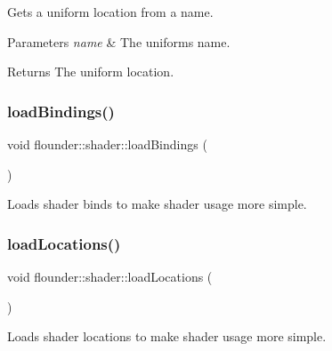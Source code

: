 Gets a uniform location from a name. 


\begin{DoxyParams}{Parameters}
{\em name} & The uniforms name. \\
\hline
\end{DoxyParams}
\begin{DoxyReturn}{Returns}
The uniform location. 
\end{DoxyReturn}
\mbox{\label{classflounder_1_1shader_ababc32f14fa38c2c3e0337c5537b1dcd}} 
\subsubsection{\texorpdfstring{load\+Bindings()}{loadBindings()}}
{\footnotesize\ttfamily void flounder\+::shader\+::load\+Bindings (\begin{DoxyParamCaption}{ }\end{DoxyParamCaption})\hspace{0.3cm}{\ttfamily [private]}}



Loads shader binds to make shader usage more simple. 

\mbox{\label{classflounder_1_1shader_a01e50af930469630a051f8bcf9a74897}} 
\subsubsection{\texorpdfstring{load\+Locations()}{loadLocations()}}
{\footnotesize\ttfamily void flounder\+::shader\+::load\+Locations (\begin{DoxyParamCaption}{ }\end{DoxyParamCaption})\hspace{0.3cm}{\ttfamily [private]}}



Loads shader locations to make shader usage more simple. 

\mbox{\label{classflounder_1_1shader_a6b9dd723ad226438a710cac8303841e5}} 
